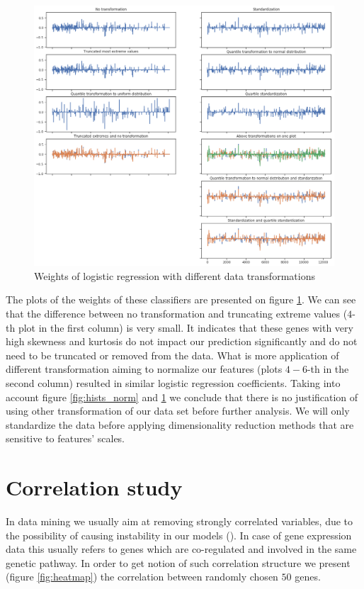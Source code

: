 \documentclass[shortabstract, english, mgr]{iithesis}
\begin{document}
\begin{figure}
\centering
\includegraphics[width=1.1\textwidth]{images/normalization_coeffs.png}
\caption{Weights of logistic regression with different data transformations}
\label{fig:normalization}
\end{figure}

The plots of the weights of these classifiers are presented on figure \ref{fig:normalization}. We can see that the difference between no transformation and truncating extreme values ($4$-th plot in the first column) is very small. It indicates that these genes with very high skewness and kurtosis do not impact our prediction significantly and do not need to be truncated or removed from the data. What is more application of different transformation aiming to normalize our features (plots $4-6$-th in the second column) resulted in similar logistic regression coefficients. Taking into account figure \ref{fig:hists_norm} and \ref{fig:normalization} we conclude that there is no justification of using other transformation of our data set before further analysis. We will only standardize the data before applying dimensionality reduction methods that are sensitive to features' scales.

\section{Correlation study}

In data mining we usually aim at removing strongly correlated variables, due to the possibility of causing instability in our models (\cite{Correlation}). In case of gene expression data this usually refers to genes which are co-regulated and involved in the same genetic pathway. In order to get notion of such correlation structure we present (figure \ref{fig:heatmap}) the correlation between randomly chosen $50$ genes. 
\end{document}

